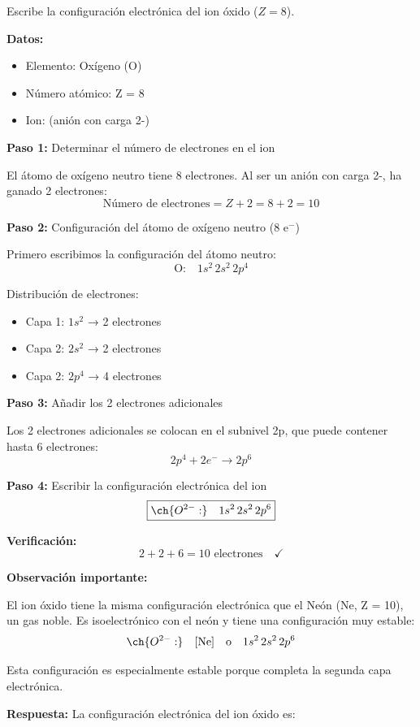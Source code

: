 \begin{exercise}
    Escribe la configuración electrónica del ion óxido  (\( Z = 8 \)).
    \begin{solu}
        \textbf{Datos:}
        \begin{itemize}
            \item Elemento: Oxígeno (O)
            \item Número atómico: Z = 8
            \item Ion:  (anión con carga 2-)
        \end{itemize}

        \textbf{Paso 1:} Determinar el número de electrones en el ion

        El átomo de oxígeno neutro tiene 8 electrones. Al ser un anión con carga 2-, ha ganado 2 electrones:
        \[
            \text{Número de electrones} = Z + 2 = 8 + 2 = 10
        \]

        \textbf{Paso 2:} Configuración del átomo de oxígeno neutro (8 e\(^-\))

        Primero escribimos la configuración del átomo neutro:
        \[
            \text{O:} \quad 1s^2 \, 2s^2 \, 2p^4
        \]

        Distribución de electrones:
        \begin{itemize}
            \item Capa 1: \(1s^2\) → 2 electrones
            \item Capa 2: \(2s^2\) → 2 electrones
            \item Capa 2: \(2p^4\) → 4 electrones
        \end{itemize}

        \textbf{Paso 3:} Añadir los 2 electrones adicionales

        Los 2 electrones adicionales se colocan en el subnivel 2p, que puede contener hasta 6 electrones:
        \[
            2p^4 + 2e^- \rightarrow 2p^6
        \]

        \textbf{Paso 4:} Escribir la configuración electrónica del ion
        \[
            \boxed{\ch{O^{2-}:} \quad 1s^2 \, 2s^2 \, 2p^6}
        \]

        \textbf{Verificación:}
        \[
            2 + 2 + 6 = 10 \text{ electrones} \quad \checkmark
        \]

        \textbf{Observación importante:}

        El ion óxido  tiene la misma configuración electrónica que el Neón (Ne, Z = 10), un gas noble. Es isoelectrónico con el neón y tiene una configuración muy estable:
        \[
            \ch{O^{2-}:} \quad [\text{Ne}] \quad \text{o} \quad 1s^2 \, 2s^2 \, 2p^6
        \]

        Esta configuración es especialmente estable porque completa la segunda capa electrónica.

        \textbf{Respuesta:} La configuración electrónica del ion óxido es: 
    \end{solu}
\end{exercise}
